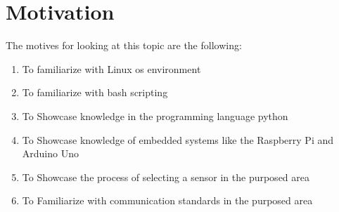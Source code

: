 
\section{Motivation}
\label{chpIntro-secMotive}
The motives for looking at this topic are the following:
\begin{enumerate}
    \item To familiarize with Linux os environment
    \item To familiarize with bash scripting
    \item To Showcase knowledge in the programming language  python
    \item To Showcase knowledge of embedded systems like the Raspberry Pi and Arduino Uno
    \item To Showcase the process of selecting a sensor in the purposed area
    \item To Familiarize  with communication standards in the purposed area
\end{enumerate}
